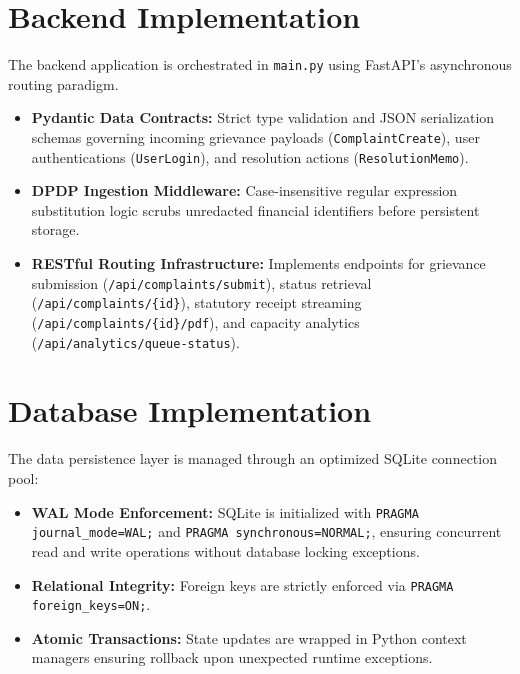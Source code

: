 \section{Backend Implementation}
The backend application is orchestrated in \texttt{main.py} using FastAPI's asynchronous routing paradigm.
\begin{itemize}
    \item \textbf{Pydantic Data Contracts:} Strict type validation and JSON serialization schemas governing incoming grievance payloads (\texttt{ComplaintCreate}), user authentications (\texttt{UserLogin}), and resolution actions (\texttt{ResolutionMemo}).
    \item \textbf{DPDP Ingestion Middleware:} Case-insensitive regular expression substitution logic scrubs unredacted financial identifiers before persistent storage.
    \item \textbf{RESTful Routing Infrastructure:} Implements endpoints for grievance submission (\texttt{/api/complaints/submit}), status retrieval (\texttt{/api/complaints/\{id\}}), statutory receipt streaming (\texttt{/api/complaints/\{id\}/pdf}), and capacity analytics (\texttt{/api/analytics/queue-status}).
\end{itemize}

\section{Database Implementation}
The data persistence layer is managed through an optimized SQLite connection pool:
\begin{itemize}
    \item \textbf{WAL Mode Enforcement:} SQLite is initialized with \texttt{PRAGMA journal\_mode=WAL;} and \texttt{PRAGMA synchronous=NORMAL;}, ensuring concurrent read and write operations without database locking exceptions.
    \item \textbf{Relational Integrity:} Foreign keys are strictly enforced via \texttt{PRAGMA foreign\_keys=ON;}.
    \item \textbf{Atomic Transactions:} State updates are wrapped in Python context managers ensuring rollback upon unexpected runtime exceptions.
\end{itemize}


